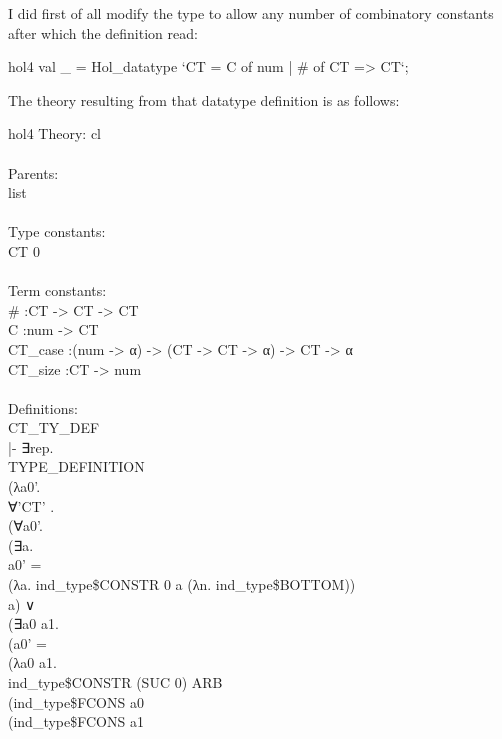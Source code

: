 I did first of all modify the type to allow any number of combinatory constants after which the definition read:

\begin{GFT}{hol4}
\+val \_ = Hol\_datatype `CT = C of num | \# of CT => CT`;\\
\end{GFT}

The theory resulting from that datatype definition is as follows:

\begin{GFT}{hol4}
\+Theory: cl\\
\+\\
\+Parents:\\
\+    list\\
\+\\
\+Type constants:\\
\+    CT 0\\
\+\\
\+Term constants:\\
\+    \#    :CT -> CT -> CT\\
\+    C    :num -> CT\\
\+    CT\_case    :(num -> α) -> (CT -> CT -> α) -> CT -> α\\
\+    CT\_size    :CT -> num\\
\+\\
\+Definitions:\\
\+    CT\_TY\_DEF\\
\+    |- ∃rep.\\
\+         TYPE\_DEFINITION\\
\+           (λa0'.\\
\+              ∀'CT' .\\
\+                (∀a0'.\\
\+                   (∃a.\\
\+                      a0' =\\
\+                      (λa. ind\_type\$CONSTR 0 a (λn. ind\_type\$BOTTOM))\\
\+                        a) ∨\\
\+                   (∃a0 a1.\\
\+                      (a0' =\\
\+                       (λa0 a1.\\
\+                          ind\_type\$CONSTR (SUC 0) ARB\\
\+                            (ind\_type\$FCONS a0\\
\+                               (ind\_type\$FCONS a1\\

\end{GFT}
